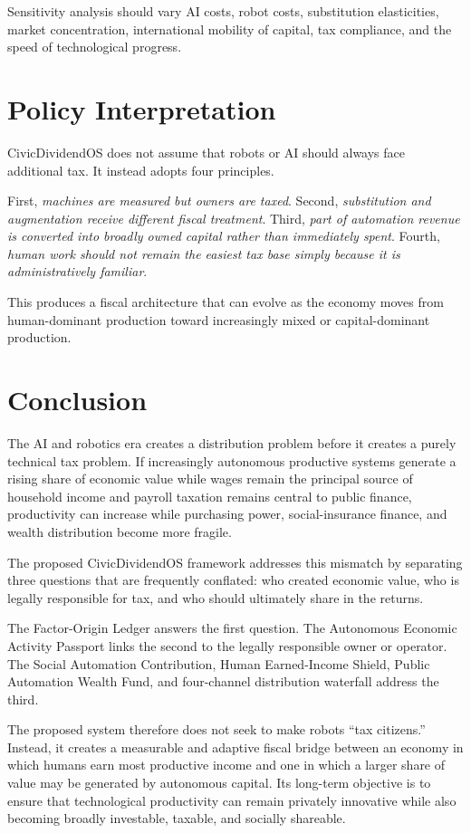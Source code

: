 \documentclass[conference]{IEEEtran}
\begin{document}
Sensitivity analysis should vary AI costs, robot costs, substitution elasticities,
market concentration, international mobility of capital, tax compliance, and
the speed of technological progress.

\section{Policy Interpretation}

CivicDividendOS does not assume that robots or AI should always face additional
tax. It instead adopts four principles.

First, \textit{machines are measured but owners are taxed}. Second,
\textit{substitution and augmentation receive different fiscal treatment}.
Third, \textit{part of automation revenue is converted into broadly owned
capital rather than immediately spent}. Fourth, \textit{human work should not
remain the easiest tax base simply because it is administratively familiar}.

This produces a fiscal architecture that can evolve as the economy moves from
human-dominant production toward increasingly mixed or capital-dominant
production.

\section{Conclusion}

The AI and robotics era creates a distribution problem before it creates a
purely technical tax problem. If increasingly autonomous productive systems
generate a rising share of economic value while wages remain the principal
source of household income and payroll taxation remains central to public
finance, productivity can increase while purchasing power, social-insurance
finance, and wealth distribution become more fragile.

The proposed CivicDividendOS framework addresses this mismatch by separating
three questions that are frequently conflated: who created economic value, who
is legally responsible for tax, and who should ultimately share in the returns.

The Factor-Origin Ledger answers the first question. The Autonomous Economic
Activity Passport links the second to the legally responsible owner or operator.
The Social Automation Contribution, Human Earned-Income Shield, Public
Automation Wealth Fund, and four-channel distribution waterfall address the
third.

The proposed system therefore does not seek to make robots ``tax citizens.''
Instead, it creates a measurable and adaptive fiscal bridge between an economy
in which humans earn most productive income and one in which a larger share of
value may be generated by autonomous capital. Its long-term objective is to
ensure that technological productivity can remain privately innovative while
also becoming broadly investable, taxable, and socially shareable.
\end{document}
